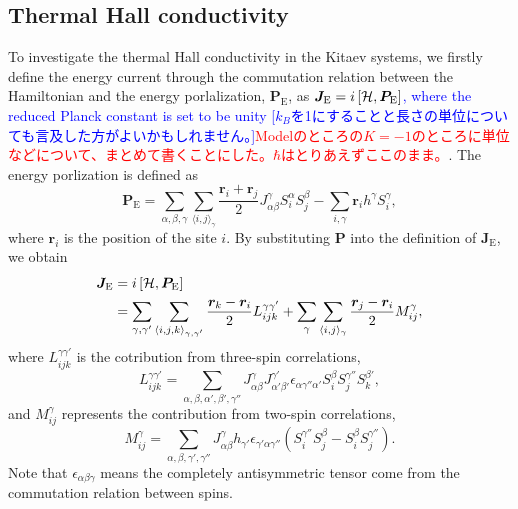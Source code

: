 \documentclass[reprint,amsmath,amssymb,aps,prx]{revtex4-2}
\newcommand{\red}[1]{\textcolor{red}{#1}}
\newcommand{\blue}[1]{\textcolor{blue}{#1}}
\begin{document}
  \subsection{Thermal Hall conductivity}
  To investigate the thermal Hall conductivity in the Kitaev systems, we firstly define the energy current through the commutation relation between the Hamiltonian and the energy porlalization, $\bm{P}_{\mathrm{E}}$, as $\bm{J}_{\mathrm{E}} =  i \left[\mathcal{H}, \bm{P}_{\mathrm{E}}\right] \notag$\blue{, where the reduced Planck constant is set to be unity [$k_B$を1にすることと長さの単位についても言及した方がよいかもしれません。]}\red{Modelのところの$K=-1$のところに単位などについて、まとめて書くことにした。$\hbar$はとりあえずここのまま。}. The energy porlization is defined as 
\begin{equation}
 \bm{P}_{\mathrm{E}} = \sum_{\alpha,\beta,\gamma}\sum_{\langle i,j\rangle_\gamma} \frac{\bm{r}_i + \bm{r}_j}{2} J_{\alpha\beta}^\gamma S_i^\alpha S_j^\beta - \sum_{i,\gamma} \bm{r}_i h^\gamma S_i^\gamma,
\end{equation}
where $\bm{r}_i$ is the position of the site $i$. By substituting $\bm{P}$ into the definition of $\bm{J}_{\mathrm{E}}$, we obtain
  \begin{align}
   \bm{J}_{\mathrm{E}} &=  i \left[\mathcal{H}, \bm{P}_{\mathrm{E}}\right] \notag \\
&= \sum_{\gamma,\gamma'}\sum_{\langle i,j,k\rangle_{\gamma,\gamma'}} \frac{\bm{r}_k-\bm{r}_i}{2}L_{ijk}^{\gamma\gamma'} + \sum_{\gamma}\sum_{\langle i,j\rangle_{\gamma}} \frac{\bm{r}_j-\bm{r}_i}{2}M_{ij}^{\gamma} 
   \label{eq:def_J},
  \end{align}
where $L_{ijk}^{\gamma\gamma'}$ is the cotribution from three-spin correlations,
\begin{equation}
 L_{ijk}^{\gamma\gamma'} = \sum_{\alpha,\beta,\alpha',\beta',\gamma''} J_{\alpha\beta}^\gamma J_{\alpha'\beta'}^{\gamma'} \epsilon_{\alpha\gamma''\alpha'} S_i^\beta S_j^{\gamma''}S_k^{\beta'},
\end{equation}
and $M_{ij}^\gamma$ represents the contribution from two-spin correlations,
\begin{equation}
 M_{ij}^{\gamma} = \sum_{\alpha,\beta,\gamma',\gamma''} J_{\alpha\beta}^\gamma h_{\gamma'} \epsilon_{\gamma'\alpha\gamma''} \left(S_i^{\gamma''} S_j^{\beta} - S_i^{\beta} S_j^{\gamma''} \right).
\end{equation}
Note that $\epsilon_{\alpha\beta\gamma}$ means the completely antisymmetric tensor come from the commutation relation between spins. 
\end{document}
